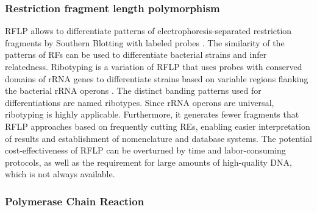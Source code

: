 \subsubsection{Restriction fragment length polymorphism}

\ac{RFLP} \cite{thibodeau_use_1987, todd_chromosome_2001} allows to differentiate patterns of electrophoresis-separated restriction fragments by Southern Blotting with labeled probes \cite{southern_detection_1975}. The similarity of the patterns of \ac{RFs} can be used to differentiate bacterial strains and infer relatedness. Ribotyping is a variation of \ac{RFLP} that uses probes with conserved domains of \ac{rRNA} genes to differentiate strains based on variable regions flanking the bacterial \ac{rRNA} operons \cite{bingen_use_1994}. The distinct banding patterns used for differentiations are named ribotypes. Since \ac{rRNA} operons are universal, ribotyping is highly applicable. Furthermore, it generates fewer fragments that \ac{RFLP} approaches based on frequently cutting \ac{REs}, enabling easier interpretation of results and establishment of nomenclature and database systems. The potential cost-effectiveness of \ac{RFLP} can be overturned by time and labor-consuming protocols, as well as the requirement for large amounts of high-quality \ac{DNA}, which is not always available.

\subsubsection{Polymerase Chain Reaction}

